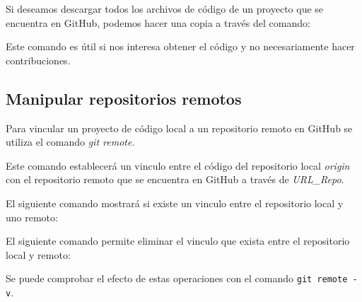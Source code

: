 Si deseamos descargar todos los archivos de código de un proyecto que se
encuentra en GitHub, podemos hacer una copia a través del comando:

\begin{Shaded}
\begin{Highlighting}[]
    \ExtensionTok{$}
\end{Highlighting}
\end{Shaded}

Este comando es útil si nos interesa obtener el código y no
necesariamente hacer contribuciones.

\subsection{Manipular repositorios remotos} 

Para vincular un proyecto de código local a un repositorio remoto en
GitHub se utiliza el comando \emph{git remote}.

\begin{Shaded}
\begin{Highlighting}[]
    \ExtensionTok{$}
\end{Highlighting}
\end{Shaded}

Este comando establecerá un vinculo entre el código del repositorio
local \emph{origin} con el repositorio remoto que se encuentra en GitHub
a través de \emph{URL\_Repo}.

El siguiente comando mostrará si existe un vinculo entre el repositorio
local y uno remoto:

\begin{Shaded}
\begin{Highlighting}[]
    \ExtensionTok{$}
\end{Highlighting}
\end{Shaded}

El siguiente comando permite eliminar el vinculo que exista entre el
repositorio local y remoto:

\begin{Shaded}
\begin{Highlighting}[]
    \ExtensionTok{$}
\end{Highlighting}
\end{Shaded}

Se puede comprobar el efecto de estas operaciones con el comando
\texttt{git\ remote\ -v}.

